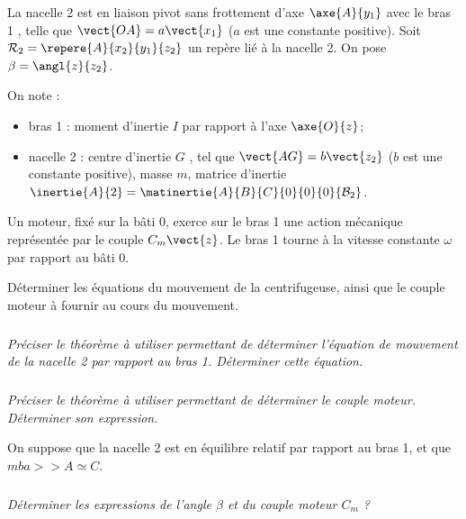 \begin{multicols}{2}
La nacelle 2 est en liaison pivot sans frottement d’axe $\axe{A}{y_1}$ avec le bras 1 , telle que $\vect{OA}=a\vect{x_1}$ ($a$ est une constante positive). Soit $\mathcal{R}_2=\repere{A}{x_2}{y_1}{z_2}$ un repère lié à la nacelle 2. On pose $\beta=\angl{z}{z_2}$. 

On note :
\begin{itemize}
\item bras 1 : moment d’inertie $I$ par rapport à l’axe $\axe{O}{z}$;
\item nacelle 2 : centre d’inertie $G$ , tel que $\vect{AG}=b\vect{z_2}$ ($b$ est une constante positive), masse $m$, 
matrice d’inertie $\inertie{A}{2}=\matinertie{A}{B}{C}{0}{0}{0}{\mathcal{B}_2}$. 
\end{itemize}
Un moteur, fixé sur la bâti 0, exerce sur le bras 1 une action mécanique représentée par le couple $C_m\vect{z}$.
Le bras 1 tourne à la vitesse constante $\omega$ par rapport au bâti 0.

\begin{obj}
Déterminer les équations du mouvement de la centrifugeuse, ainsi que le couple moteur à fournir au cours du
mouvement.
\end{obj}

\subparagraph{}
\textit{Préciser le théorème à utiliser permettant de déterminer l’équation de mouvement de la nacelle 2 par rapport au
bras 1. Déterminer cette équation.}
\ifprof
\begin{corrige}
\end{corrige}
\else
\fi

\subparagraph{}
\textit{Préciser le théorème à utiliser permettant de déterminer le couple moteur. Déterminer son expression.}
\ifprof
\begin{corrige}
\end{corrige}
\else
\fi

On suppose que la nacelle 2 est en équilibre relatif par rapport au bras 1, et que $mba> > A \simeq C$.

\subparagraph{}
\textit{Déterminer les expressions de l’angle $\beta$ et du couple moteur $C_m$ ?}
\ifprof
\begin{corrige}
\end{corrige}
\else
\fi



\end{multicols}
\fi

